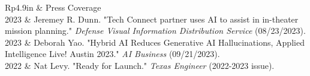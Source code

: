 \documentclass[letterpaper, 11pt]{article}
\newcommand{\headingfont}{\Large\color{CustomBlue}}
\newenvironment{SectionTable}[1]{
	\renewcommand*{\arraystretch}{1.3} %
	\setlength{\tabcolsep}{10pt}
	\begin{longtable}{Rp{4.9in}} & #1 \\}
{\end{longtable}}
\begin{document}
\vspace{-0.5cm}

\begin{SectionTable}{\headingfont Press Coverage}

2023 & Jeremey R. Dunn. "Tech Connect partner uses AI to assist in in-theater mission planning." \textit{Defense Visual Information Distribution Service} (08/23/2023). \\

2023 & Deborah Yao. "Hybrid AI Reduces Generative AI Hallucinations, Applied Intelligence Live! Austin 2023." \textit{AI Business} (09/21/2023). \\

2022 & Nat Levy. "Ready for Launch." \textit{Texas Engineer} (2022-2023 issue).

\end{SectionTable}

\vspace{-1.0cm}
\end{document}
